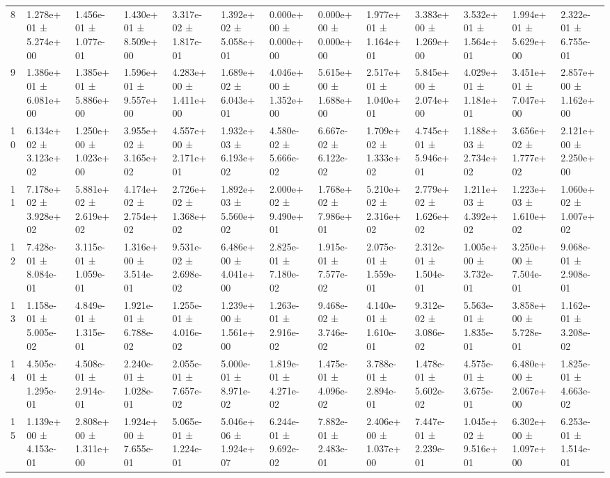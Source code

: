 \begin{table}
\begin{tabular}{lllllllllllll}
8 & 1.278e+01 ± 5.274e+00 & 1.456e-01 ± 1.077e-01 & 1.430e+01 ± 8.509e+00 & 3.317e-02 ± 1.817e-01 & 1.392e+02 ± 5.058e+01 & 0.000e+00 ± 0.000e+00 & 0.000e+00 ± 0.000e+00 & 1.977e+01 ± 1.164e+01 & 3.383e+00 ± 1.269e+00 & 3.532e+01 ± 1.564e+01 & 1.994e+01 ± 5.629e+00 & 2.322e-01 ± 6.755e-01 \\
9 & 1.386e+01 ± 6.081e+00 & 1.385e+01 ± 5.886e+00 & 1.596e+01 ± 9.557e+00 & 4.283e+00 ± 1.411e+00 & 1.689e+02 ± 6.043e+01 & 4.046e+00 ± 1.352e+00 & 5.615e+00 ± 1.688e+00 & 2.517e+01 ± 1.040e+01 & 5.845e+00 ± 2.074e+00 & 4.029e+01 ± 1.184e+01 & 3.451e+01 ± 7.047e+00 & 2.857e+00 ± 1.162e+00 \\
10 & 6.134e+02 ± 3.123e+02 & 1.250e+00 ± 1.023e+00 & 3.955e+02 ± 3.165e+02 & 4.557e+00 ± 2.171e+01 & 1.932e+03 ± 6.193e+02 & 4.580e-02 ± 5.666e-02 & 6.667e-02 ± 6.122e-02 & 1.709e+02 ± 1.333e+02 & 4.745e+01 ± 5.946e+01 & 1.188e+03 ± 2.734e+02 & 3.656e+02 ± 1.777e+02 & 2.121e+00 ± 2.250e+00 \\
11 & 7.178e+02 ± 3.928e+02 & 5.881e+02 ± 2.619e+02 & 4.174e+02 ± 2.754e+02 & 2.726e+02 ± 1.368e+02 & 1.892e+03 ± 5.560e+02 & 2.000e+02 ± 9.490e+01 & 1.768e+02 ± 7.986e+01 & 5.210e+02 ± 2.316e+02 & 2.779e+02 ± 1.626e+02 & 1.211e+03 ± 4.392e+02 & 1.223e+03 ± 1.610e+02 & 1.060e+02 ± 1.007e+02 \\
12 & 7.428e-01 ± 8.084e-01 & 3.115e-01 ± 1.059e-01 & 1.316e+00 ± 3.514e-01 & 9.531e-02 ± 2.698e-02 & 6.486e+00 ± 4.041e+00 & 2.825e-01 ± 7.180e-02 & 1.915e-01 ± 7.577e-02 & 2.075e-01 ± 1.559e-01 & 2.312e-01 ± 1.504e-01 & 1.005e+00 ± 3.732e-01 & 3.250e+00 ± 7.504e-01 & 9.068e-01 ± 2.908e-01 \\
13 & 1.158e-01 ± 5.005e-02 & 4.849e-01 ± 1.315e-01 & 1.921e-01 ± 6.788e-02 & 1.255e-01 ± 4.016e-02 & 1.239e+00 ± 1.561e+00 & 1.263e-01 ± 2.916e-02 & 9.468e-02 ± 3.746e-02 & 4.140e-01 ± 1.610e-01 & 9.312e-02 ± 3.086e-02 & 5.563e-01 ± 1.835e-01 & 3.858e+00 ± 5.728e-01 & 1.162e-01 ± 3.208e-02 \\
14 & 4.505e-01 ± 1.295e-01 & 4.508e-01 ± 2.914e-01 & 2.240e-01 ± 1.028e-01 & 2.055e-01 ± 7.657e-02 & 5.000e-01 ± 8.971e-02 & 1.819e-01 ± 4.271e-02 & 1.475e-01 ± 4.096e-02 & 3.788e-01 ± 2.894e-01 & 1.478e-01 ± 5.602e-02 & 4.575e-01 ± 3.675e-01 & 6.480e+00 ± 2.067e+00 & 1.825e-01 ± 4.663e-02 \\
15 & 1.139e+00 ± 4.153e-01 & 2.808e+00 ± 1.311e+00 & 1.924e+00 ± 7.655e-01 & 5.065e-01 ± 1.224e-01 & 5.046e+06 ± 1.924e+07 & 6.244e-01 ± 9.692e-02 & 7.882e-01 ± 2.483e-01 & 2.406e+00 ± 1.037e+00 & 7.447e-01 ± 2.239e-01 & 1.045e+02 ± 9.516e+01 & 6.302e+00 ± 1.097e+00 & 6.253e-01 ± 1.514e-01 \\

\end{tabular}
\end{table}
